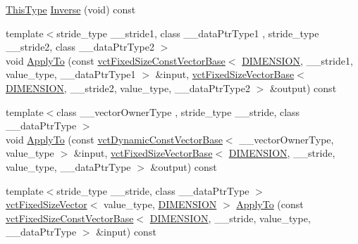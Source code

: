 \begin{DoxyCompactItemize}
\item 
\hyperlink{classvct_quaternion_base_af28efdc38acf89acb7a67afada11408c}{This\+Type} \hyperlink{classvct_quaternion_rotation3_base_af658926043f0deab6997881cd9fff822}{Inverse} (void) const 
\item 
{\footnotesize template$<$stride\+\_\+type \+\_\+\+\_\+stride1, class \+\_\+\+\_\+data\+Ptr\+Type1 , stride\+\_\+type \+\_\+\+\_\+stride2, class \+\_\+\+\_\+data\+Ptr\+Type2 $>$ }\\void \hyperlink{classvct_quaternion_rotation3_base_abd3b8ecd60488880c6dbeb7b614589ec}{Apply\+To} (const \hyperlink{classvct_fixed_size_const_vector_base}{vct\+Fixed\+Size\+Const\+Vector\+Base}$<$ \hyperlink{classvct_quaternion_rotation3_base_a729ac03acdd5949ecf382629e563d2a0a9417132a8a6849e18439d903ae6a1f18}{D\+I\+M\+E\+N\+S\+I\+O\+N}, \+\_\+\+\_\+stride1, value\+\_\+type, \+\_\+\+\_\+data\+Ptr\+Type1 $>$ \&input, \hyperlink{classvct_fixed_size_vector_base}{vct\+Fixed\+Size\+Vector\+Base}$<$ \hyperlink{classvct_quaternion_rotation3_base_a729ac03acdd5949ecf382629e563d2a0a9417132a8a6849e18439d903ae6a1f18}{D\+I\+M\+E\+N\+S\+I\+O\+N}, \+\_\+\+\_\+stride2, value\+\_\+type, \+\_\+\+\_\+data\+Ptr\+Type2 $>$ \&output) const 
\item 
{\footnotesize template$<$class \+\_\+\+\_\+vector\+Owner\+Type , stride\+\_\+type \+\_\+\+\_\+stride, class \+\_\+\+\_\+data\+Ptr\+Type $>$ }\\void \hyperlink{classvct_quaternion_rotation3_base_a2f9afc18f09f6b2d614121fbd65f16ae}{Apply\+To} (const \hyperlink{classvct_dynamic_const_vector_base}{vct\+Dynamic\+Const\+Vector\+Base}$<$ \+\_\+\+\_\+vector\+Owner\+Type, value\+\_\+type $>$ \&input, \hyperlink{classvct_fixed_size_vector_base}{vct\+Fixed\+Size\+Vector\+Base}$<$ \hyperlink{classvct_quaternion_rotation3_base_a729ac03acdd5949ecf382629e563d2a0a9417132a8a6849e18439d903ae6a1f18}{D\+I\+M\+E\+N\+S\+I\+O\+N}, \+\_\+\+\_\+stride, value\+\_\+type, \+\_\+\+\_\+data\+Ptr\+Type $>$ \&output) const 
\item 
{\footnotesize template$<$stride\+\_\+type \+\_\+\+\_\+stride, class \+\_\+\+\_\+data\+Ptr\+Type $>$ }\\\hyperlink{classvct_fixed_size_vector}{vct\+Fixed\+Size\+Vector}$<$ value\+\_\+type, \hyperlink{classvct_quaternion_rotation3_base_a729ac03acdd5949ecf382629e563d2a0a9417132a8a6849e18439d903ae6a1f18}{D\+I\+M\+E\+N\+S\+I\+O\+N} $>$ \hyperlink{classvct_quaternion_rotation3_base_ae06cb9fb49e622bcfdf2e374a393cddd}{Apply\+To} (const \hyperlink{classvct_fixed_size_const_vector_base}{vct\+Fixed\+Size\+Const\+Vector\+Base}$<$ \hyperlink{classvct_quaternion_rotation3_base_a729ac03acdd5949ecf382629e563d2a0a9417132a8a6849e18439d903ae6a1f18}{D\+I\+M\+E\+N\+S\+I\+O\+N}, \+\_\+\+\_\+stride, value\+\_\+type, \+\_\+\+\_\+data\+Ptr\+Type $>$ \&input) const 

\end{DoxyCompactItemize}
